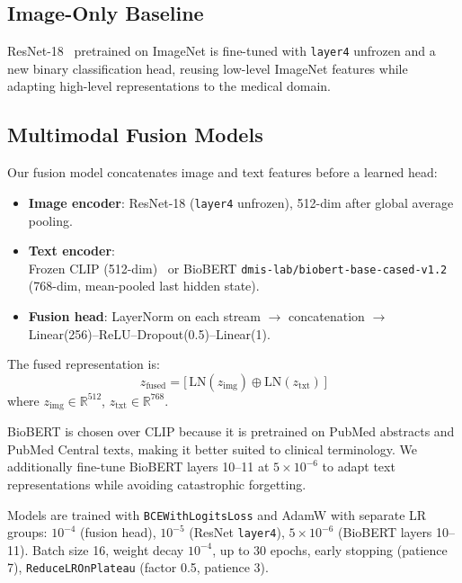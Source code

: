 \documentclass{article}
\begin{document}
\subsection{Image-Only Baseline}
ResNet-18~\cite{he2016resnet} pretrained on ImageNet is fine-tuned with
\texttt{layer4} unfrozen and a new binary classification head, reusing
low-level ImageNet features while adapting high-level representations to the
medical domain.

\subsection{Multimodal Fusion Models}
\label{sec:fusion}

Our fusion model concatenates image and text features before a learned head:
\begin{itemize}
  \item \textbf{Image encoder}: ResNet-18 (\texttt{layer4} unfrozen), 512-dim
        after global average pooling.
  \item \textbf{Text encoder}: \\Frozen CLIP (512-dim)~\cite{radford2021clip} or
        BioBERT \texttt{dmis-lab/biobert-base-cased-v1.2}~\cite{lee2020biobert}
        (768-dim, mean-pooled last hidden state).
  \item \textbf{Fusion head}: LayerNorm on each stream $\rightarrow$
        concatenation $\rightarrow$ Linear(256)--ReLU--Dropout(0.5)--Linear(1).
\end{itemize}

The fused representation is:
\begin{equation}
  z_{\text{fused}} = \bigl[\,\text{LN}(z_{\text{img}}) \oplus \text{LN}(z_{\text{txt}})\,\bigr]
\end{equation}
\hspace{4.65cm} where $z_{\text{img}} \in \mathbb{R}^{512}$, $z_{\text{txt}} \in \mathbb{R}^{768}$.

BioBERT is chosen over CLIP because it is pretrained on PubMed abstracts and
PubMed Central texts, making it better suited to clinical terminology. We
additionally fine-tune BioBERT layers 10--11 at $5\times10^{-6}$ to adapt text
representations while avoiding catastrophic forgetting.

Models are trained with \texttt{BCEWithLogitsLoss} and AdamW with separate LR
groups: $10^{-4}$ (fusion head), $10^{-5}$ (ResNet \texttt{layer4}), $5\times
10^{-6}$ (BioBERT layers 10--11). Batch size 16, weight decay $10^{-4}$, up to
30 epochs, early stopping (patience 7), \texttt{ReduceLROnPlateau} (factor 0.5,
patience 3).
\end{document}
